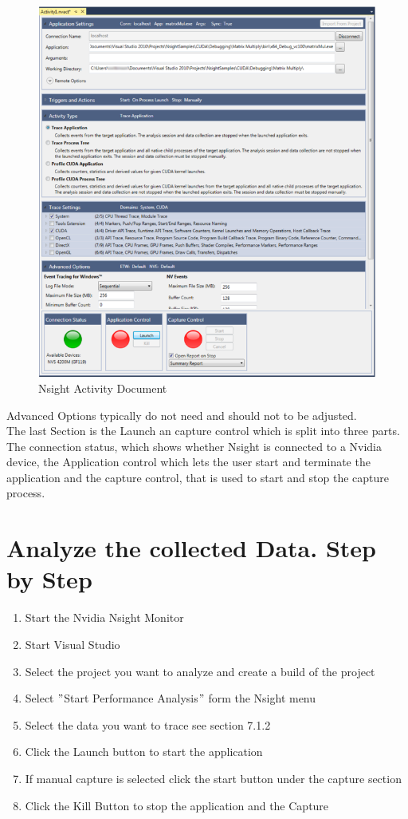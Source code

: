 \begin{figure}[htbp]
\includegraphics[scale = 0.42]{img/NSight_Application_Document.png}
\caption{Nsight Activity Document}
\label{fig:Nsight_Activtiy_Page}
\end{figure}

Advanced Options typically do not need and should not to be adjusted.\\
The last Section is the Launch an capture control which is split into three parts. The connection status, which shows whether Nsight is connected to a Nvidia device, the Application control which lets the user start and terminate the application and the capture control, that is used to start and stop the capture process.

\section{Analyze the collected Data. Step by Step}

\begin{enumerate}
    \item Start the Nvidia Nsight Monitor
    \item Start Visual Studio
    \item Select the project you want to analyze and create a build of the project
    \item Select $"$Start Performance Analysis$"$ form the Nsight menu
    \item Select the data you want to trace see section 7.1.2 
    \item Click the Launch button to start the application
    \item If manual capture is selected click the start button under the capture section
    \item Click the Kill Button to stop the application and the Capture
\end{enumerate}

